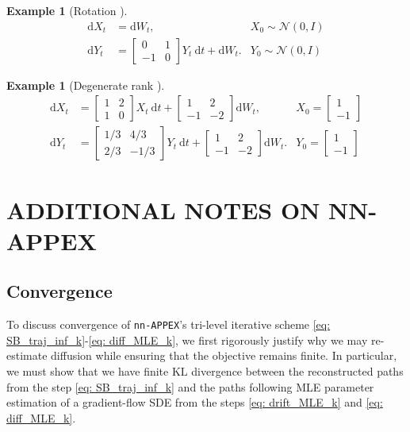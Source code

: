 \documentclass[twoside]{article}
\newcommand{\nappex}{\texttt{nn-APPEX}}
\newtheorem{ex}[theorem]{Example}
\begin{document}
\begin{ex}[Rotation ]
\label{eq: non_identifiability_rotation}
\begin{align*}
    \mathrm{d}X_t &= \mathrm{d}W_t, &X_0 \sim \mathcal{N}(0, I)\\
    \mathrm{d}Y_t &= \begin{bmatrix} 0 & 1 \\ -1 & 0  \end{bmatrix}Y_t \: \mathrm{d}t
    + \mathrm{d}W_t. &  Y_0 \sim \mathcal{N}(0, I)
\end{align*}
\end{ex}
\begin{ex}[Degenerate rank ]
\label{eq: non_identifiability_wang}
\begin{align*}
    \mathrm{d}X_t &= \begin{bmatrix} 1 & 2 \\ 1 & 0  \end{bmatrix} X_t \: \mathrm{d}t
    +  \begin{bmatrix} 1 & 2 \\ -1 & -2  \end{bmatrix}\mathrm{d}W_t, &X_0 = \begin{bmatrix}
    1 \\ -1
    \end{bmatrix}\\
    \mathrm{d}Y_t &=  \begin{bmatrix} 1/3 & 4/3 \\ 2/3 & -1/3  \end{bmatrix} Y_t \: \mathrm{d}t
    + \begin{bmatrix} 1 & 2 \\ -1 & -2  \end{bmatrix}\mathrm{d}W_t. &Y_0 = \begin{bmatrix}
    1 \\ -1
    \end{bmatrix}
\end{align*}
\end{ex}


\section{ADDITIONAL NOTES ON NN-APPEX}
\label{sec: supplement_sb_refinement}



\subsection{Convergence}
To discuss convergence of \nappex's tri-level iterative scheme \eqref{eq: SB_traj_inf_k}-\eqref{eq: diff_MLE_k}, we first rigorously justify why we may re-estimate diffusion while ensuring that the objective remains finite. In particular, we must show that we have finite $\mathrm{KL}$ divergence between the reconstructed paths from the step \eqref{eq: SB_traj_inf_k} and the paths following MLE parameter estimation of a gradient-flow SDE from the steps \eqref{eq: drift_MLE_k} and \eqref{eq: diff_MLE_k}. 
\end{document}
